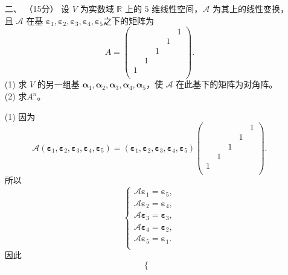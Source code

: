 \begin{enumerate}[1~]
\item[二、]（15分）
设 $V$ 为实数域 $\mathbb{R}$ 上的 $5$ 维线性空间，$\mathscr{A}$ 为其上的线性变换，且 $\mathscr{A}$ 在基 $\boldsymbol{\varepsilon} _ { 1 } , \boldsymbol{\varepsilon} _ { 2 } , \boldsymbol{\varepsilon} _ { 3 } , \boldsymbol{\varepsilon} _ { 4 } , \boldsymbol{\varepsilon} _ { 5 }$之下的矩阵为\[
A=\left( \begin{matrix}
	&		&		&		&		1\\
	&		&		&		1&		\\
	&		&		1&		&		\\
	&		1&		&		&		\\
	1&		&		&		&		\\
\end{matrix} \right) .
\]
(1) 求 $V$ 的另一组基 $\boldsymbol{\alpha} _ { 1 } , \boldsymbol{\alpha} _ { 2 } , \boldsymbol{\alpha} _ { 3 } , \boldsymbol{\alpha} _ { 4 } , \boldsymbol{\alpha} _ { 5 }$，使 $\mathscr{A}$ 在此基下的矩阵为对角阵。\\
(2) 求$A^n$。
\begin{solution}
(1) 因为\[
\mathscr{A}(\boldsymbol{\varepsilon} _ { 1 } , \boldsymbol{\varepsilon} _ { 2 } , \boldsymbol{\varepsilon} _ { 3 } , \boldsymbol{\varepsilon} _ { 4 } , \boldsymbol{\varepsilon} _ { 5 })=(\boldsymbol{\varepsilon} _ { 1 } , \boldsymbol{\varepsilon} _ { 2 } , \boldsymbol{\varepsilon} _ { 3 } , \boldsymbol{\varepsilon} _ { 4 } , \boldsymbol{\varepsilon} _ { 5 }) \left( \begin{matrix}
	&		&		&		&		1\\
	&		&		&		1&		\\
	&		&		1&		&		\\
	&		1&		&		&		\\
	1&		&		&		&		\\
\end{matrix} \right).
\]
所以\[
\left\{ \begin{array}{l}
	\mathscr{A}\boldsymbol{\varepsilon} _1=\boldsymbol{\varepsilon} _5,\\
	\mathscr{A}\boldsymbol{\varepsilon} _2=\boldsymbol{\varepsilon} _4,\\
	\mathscr{A}\boldsymbol{\varepsilon} _3=\boldsymbol{\varepsilon} _3,\\
	\mathscr{A}\boldsymbol{\varepsilon} _4=\boldsymbol{\varepsilon} _2,\\
	\mathscr{A}\boldsymbol{\varepsilon} _5=\boldsymbol{\varepsilon} _1.\\
\end{array} \right. 
\]
因此\[
\left\{ \begin{array}{l}

\end{array}\]
\end{solution}
\end{enumerate}
